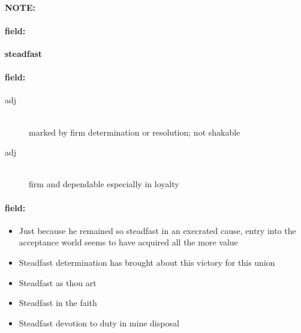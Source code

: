 \documentclass[12pt]{article}
\newenvironment{note}{\paragraph{NOTE:}}{}
\newenvironment{field}{\paragraph{field:}}{}
\begin{document}
\begin{note}
\begin{field}
\textbf{\large steadfast}
\end{field}


\begin{field}
\begin{description}
\item[adj] \hfill \\ 
marked by firm determination or resolution; not shakable

\item[adj] \hfill \\ 
firm and dependable especially in loyalty

\end{description}
\end{field}

\begin{field}
\begin{itemize}
\item Just because he remained so steadfast in an execrated cause, entry into the acceptance world seems to have acquired all the more value
\item Steadfast determination has brought about this victory for this union
\item Steadfast as thou art
\item Steadfast in the faith
\item Steadfast devotion to duty in mine disposal
\end{itemize}
\end{field}
\end{note}
\end{document}
